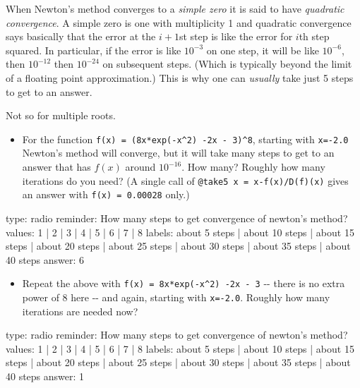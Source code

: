 \documentclass[12pt]{article}
\begin{document}
When Newton's method converges to a \emph{simple zero} it is said to
have \emph{quadratic convergence}. A simple zero is one with
multiplicity 1 and quadratic convergence says basically that the error
at the $i+1$st step is like the error for $i$th step squared. In
particular, if the error is like $10^{-3}$ on one step, it will be like
$10^{-6}$, then $10^{-12}$ then $10^{-24}$ on subsequent steps. (Which
is typically beyond the limit of a floating point approximation.) This
is why one can \emph{usually} take just 5 steps to get to an answer.

Not so for multiple roots.

\begin{itemize}
\itemsep1pt\parskip0pt
\item
  For the function \texttt{f(x) = (8x*exp(-x\^{}2) -2x - 3)\^{}8},
  starting with \texttt{x=-2.0} Newton's method will converge, but it
  will take many steps to get to an answer that has $f(x)$ around
  $10^{-16}$. How many? Roughly how many iterations do you need? (A
  single call of \texttt{@take5 x   = x-f(x)/D(f)(x)} gives an answer
  with \texttt{f(x) = 0.00028} only.)
\end{itemize}

\begin{answer}
type: radio
reminder: How many steps to get convergence of newton's method?
values: 1 | 2 | 3 | 4 | 5 | 6 | 7 | 8
labels: about 5 steps | about 10 steps | about 15 steps | about 20 steps | about 25 steps | about 30 steps | about 35 steps | about 40 steps
answer: 6
\end{answer}

\begin{itemize}
\itemsep1pt\parskip0pt
\item
  Repeat the above with \texttt{f(x) = 8x*exp(-x\^{}2) -2x - 3} -{}-
  there is no extra power of $8$ here -{}- and again, starting with
  \texttt{x=-2.0}. Roughly how many iterations are needed now?
\end{itemize}

\begin{answer}
type: radio
reminder: How many steps to get convergence of newton's method?
values: 1 | 2 | 3 | 4 | 5 | 6 | 7 | 8
labels: about 5 steps | about 10 steps | about 15 steps | about 20 steps | about 25 steps | about 30 steps | about 35 steps | about 40 steps
answer: 1
\end{answer}
\end{document}
